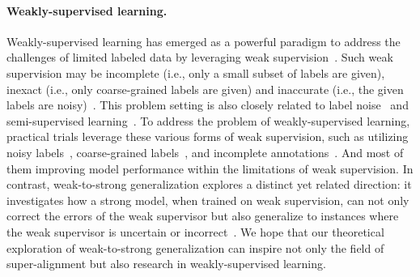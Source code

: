 \paragraph{Weakly-supervised learning.}
Weakly-supervised learning has emerged as a powerful paradigm to address the challenges of limited labeled data by leveraging weak supervision~\citep{ratner2020snorkel}.
Such weak supervision may be incomplete (i.e., only a small subset of labels are given), inexact (i.e., only coarse-grained labels are given) and inaccurate (i.e., the given labels are noisy)~\citep{zhou2018brief}.
This problem setting is also closely related to label noise~\citep{song2022learning} and semi-supervised learning~\citep{van2020survey}.
To address the problem of weakly-supervised learning, practical trials leverage these various forms of weak supervision, such as utilizing noisy labels~\citep{cheng2020weakly}, coarse-grained labels~\citep{oquab2015object}, and incomplete annotations~\citep{papadopoulos2017training}.
And most of them improving model performance within the limitations of weak supervision.
In contrast, weak-to-strong generalization explores a distinct yet related direction: it investigates how a strong model, when trained on weak supervision, can not only correct the errors of the weak supervisor but also generalize to instances where the weak supervisor is uncertain or incorrect~\citep{burns2023weak,yang2024super}. 
We hope that our theoretical exploration of weak-to-strong generalization can inspire not only the field of super-alignment but also research in weakly-supervised learning.










